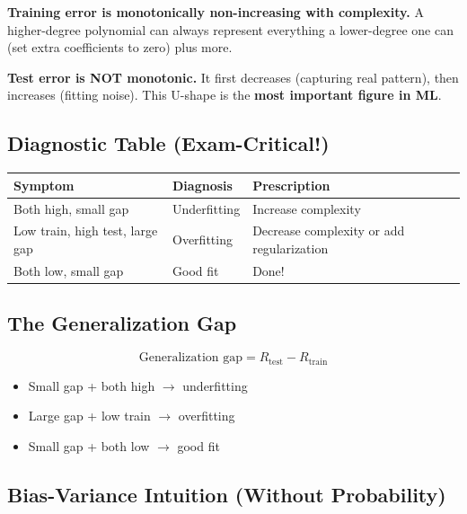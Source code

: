 \documentclass[11pt,a4paper]{article}
\begin{document}
\begin{tcolorbox}[colback=yellow!10,colframe=orange!50]
\textbf{Training error is monotonically non-increasing with complexity.} A higher-degree polynomial can always represent everything a lower-degree one can (set extra coefficients to zero) plus more.
\end{tcolorbox}

\begin{tcolorbox}[colback=yellow!10,colframe=orange!50]
\textbf{Test error is NOT monotonic.} It first decreases (capturing real pattern), then increases (fitting noise). This U-shape is the \textbf{most important figure in ML}.
\end{tcolorbox}

\subsection{Diagnostic Table (Exam-Critical!)}

\begin{center}
\begin{tabular}{|l|l|l|}
\hline
\textbf{Symptom} & \textbf{Diagnosis} & \textbf{Prescription} \\
\hline
Both high, small gap & Underfitting & Increase complexity \\
Low train, high test, large gap & Overfitting & Decrease complexity or add regularization \\
Both low, small gap & Good fit & Done! \\
\hline
\end{tabular}
\end{center}

\subsection{The Generalization Gap}

$$\text{Generalization gap} = R_{\text{test}} - R_{\text{train}}$$

\begin{itemize}
    \item Small gap + both high $\to$ underfitting
    \item Large gap + low train $\to$ overfitting
    \item Small gap + both low $\to$ good fit
\end{itemize}

\subsection{Bias-Variance Intuition (Without Probability)}
\end{document}
